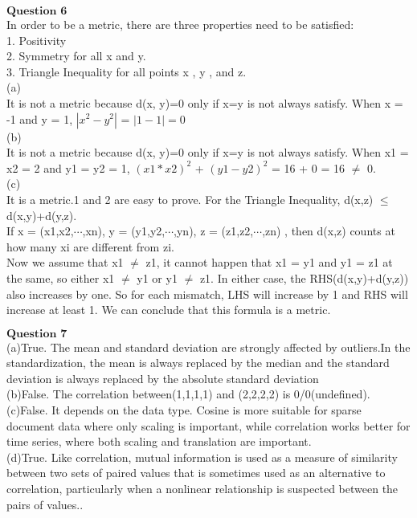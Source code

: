 \documentclass[12pt]{article}
\begin{document}
\newpage

$\textbf{Question 6}$\\

In order to be a metric, there are three properties need to be satisfied:\\

1. Positivity\\

2. Symmetry for all x and y.\\

3. Triangle Inequality for all points x , y , and z.\\

(a)\\

It is not a metric because d(x, y)=0 only if x=y is not always satisfy. When x = -1 and y = 1, $|x^2-y^2|$ = $|1-1| = 0$\\

(b)\\

It is not a metric because d(x, y)=0 only if x=y is not always satisfy. When x1 = x2 = 2 and y1 = y2 = 1, $(x1 * x2)^2$ + $(y1 - y2)^2$ = 16 + 0 = 16 $\neq$ 0.\\


(c)\\

It is a metric.1 and 2 are easy to prove. For the Triangle Inequality, d(x,z) $\leq$ d(x,y)+d(y,z).\\

If x = (x1,x2,$\cdots$,xn), y = (y1,y2,$\cdots$,yn), z = (z1,z2,$\cdots$,zn) , then d(x,z) counts at how many xi are different from zi. \\

Now we assume that x1 $\neq$ z1, it cannot happen that x1 = y1 and y1 = z1 at the same, so either x1 $\neq$ y1 or y1         $\neq$ z1. In either case, the RHS(d(x,y)+d(y,z)) also increases by one. So for each mismatch, LHS will increase by 1 and RHS will increase at least 1. We can conclude that this formula is a metric.\\ 

\newpage

$\textbf{Question 7}$\\

(a)True. The mean and standard deviation are strongly affected by outliers.In the standardization, the mean is always replaced by the median and the standard deviation is always replaced by the absolute standard deviation\\

(b)False. The correlation between(1,1,1,1) and (2,2,2,2) is 0/0(undefined).\\

(c)False. It depends on the data type. Cosine is more suitable for sparse document data where only scaling is important, while correlation works better for time series, where both scaling and translation are important.\\

(d)True. Like correlation, mutual information is used as a measure of similarity
between two sets of paired values that is sometimes used as an alternative to
correlation, particularly when a nonlinear relationship is suspected between
the pairs of values..\\
\end{document}
